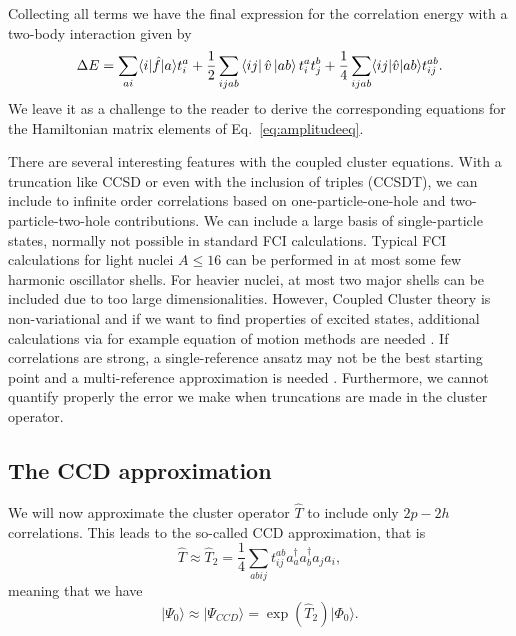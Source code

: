  Collecting all terms we have   the final expression for the correlation energy with a two-body interaction given by
  \begin{equation}\label{eq:energyccsd}
  \Delta E=\sum_{ai}\langle i| \hat{f}|a \rangle t_{i}^{a}+\frac{1}{2} \sum_{ijab} \bra{ij}\hat{v}\ket{ab} t_i^a t_j^b+
  \frac{1}{4}\sum_{ijab}\langle ij | \hat{v}| ab \rangle t_{ij}^{ab}.
  \end{equation}
We leave it as a challenge to the reader to derive the corresponding equations for the Hamiltonian matrix elements of Eq.~\ref{eq:amplitudeeq}.


  There are several interesting features with the coupled cluster
  equations. With a truncation like CCSD or even with the inclusion of
  triples (CCSDT), we can include to infinite order correlations based
  on one-particle-one-hole and two-particle-two-hole contributions.
  We can include a large basis of single-particle states, normally not
  possible in standard FCI calculations. Typical FCI calculations for
  light nuclei $A\le 16$ can be performed in at most some few harmonic
  oscillator shells. For heavier nuclei, at most two major shells can
  be included due to too large dimensionalities.  However, Coupled
  Cluster theory is non-variational and if we want to find properties
  of excited states, additional calculations via for example equation
  of motion methods are needed \cite{shavittbartlett2009,hagen2014}.
  If correlations are strong, a single-reference ansatz may not be the
  best starting point and a multi-reference approximation is needed
  \cite{jansen2015}. Furthermore, we cannot quantify properly the
  error we make when truncations are made in the cluster operator.

  \subsection{The CCD approximation}

  We will now approximate the cluster operator $\hat{T}$ to include
  only $2p-2h$ correlations. This leads to the so-called CCD
  approximation, that is
  \[
  \hat{T}\approx
  \hat{T}_2=\frac{1}{4}\sum_{abij}t_{ij}^{ab}a^{\dagger}_aa^{\dagger}_ba_ja_i,
  \]
  meaning that we have
  \[
  \vert \Psi_0 \rangle \approx \vert \Psi_{CCD} \rangle =
  \exp{\left(\hat{T}_2\right)}\vert \Phi_0\rangle.
  \]


